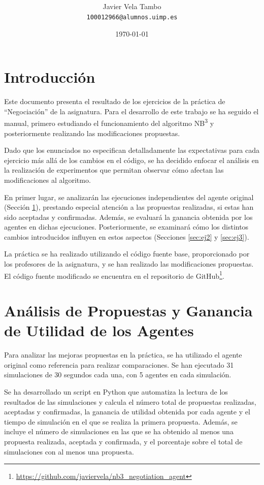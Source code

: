 \documentclass[12pt]{article}
\author{Javier Vela Tambo \\ \texttt{100012966@alumnos.uimp.es}}
\date{\today}
\title{
    \vspace{1cm}
    \titletext \\
    \vspace{0.35cm}
    \large \mastername \\
    \vspace{0.35cm}
    \large \subjectname
}
\begin{document}
\maketitle

\section*{Introducción}

Este documento presenta el resultado de los ejercicios de la práctica de ``Negociación'' de la asignatura. Para el desarrollo de este trabajo se ha seguido el manual\cite{manual}, primero estudiando el funcionamiento del algoritmo NB\textsuperscript{3}\cite{nb3} y posteriormente realizando las modificaciones propuestas.

Dado que los enunciados no especifican detalladamente las expectativas para cada ejercicio más allá de los cambios en el código, se ha decidido enfocar el análisis en la realización de experimentos que permitan observar cómo afectan las modificaciones al algoritmo.

En primer lugar, se analizarán las ejecuciones independientes del agente original (Sección \ref{sec:ej1}), prestando especial atención a las propuestas realizadas, si estas han sido aceptadas y confirmadas. Además, se evaluará la ganancia obtenida por los agentes en dichas ejecuciones. Posteriormente, se examinará cómo los distintos cambios introducidos influyen en estos aspectos (Secciones \ref{sec:ej2} y \ref{sec:ej3}).

La práctica se ha realizado utilizando el código fuente base, proporcionado por los profesores de la asignatura, y se han realizado las modificaciones propuestas. El código fuente modificado se encuentra en el repositorio de GitHub\footnote{\url{https://github.com/javiervela/nb3_negotiation_agent}}.

\newpage

\section{Análisis de Propuestas y Ganancia de Utilidad de los Agentes}\label{sec:ej1}

Para analizar las mejoras propuestas en la práctica, se ha utilizado el agente original como referencia para realizar comparaciones. Se han ejecutado 31 simulaciones de 30 segundos cada una, con 5 agentes en cada simulación.

Se ha desarrollado un script en Python que automatiza la lectura de los resultados de las simulaciones y calcula el número total de propuestas realizadas, aceptadas y confirmadas, la ganancia de utilidad obtenida por cada agente y el tiempo de simulación en el que se realiza la primera propuesta. Además, se incluye el número de simulaciones en las que se ha obtenido al menos una propuesta realizada, aceptada y confirmada, y el porcentaje sobre el total de simulaciones con al menos una propuesta.
\end{document}
